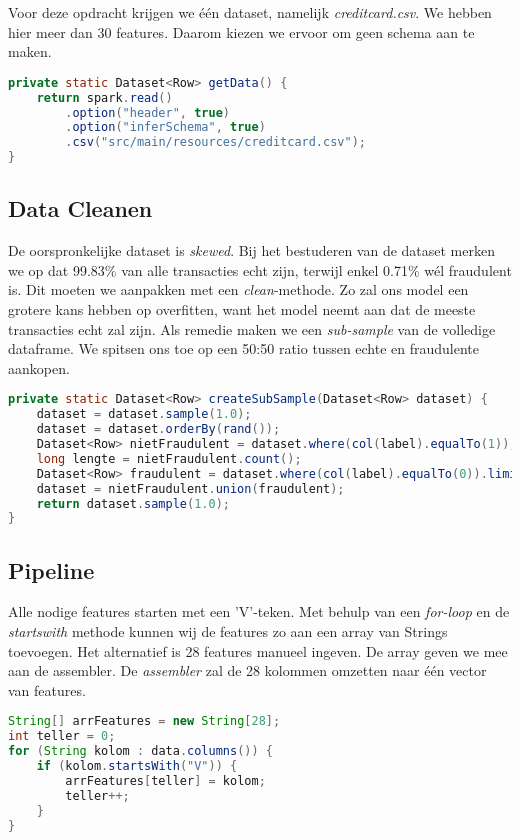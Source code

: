\documentclass[a4paper,10pt,twoside]{report}
\begin{document}
Voor deze opdracht krijgen we één dataset, namelijk \textit{creditcard.csv}. We hebben hier meer dan 30 features. Daarom kiezen we ervoor om geen schema aan te maken.

\begin{lstlisting}[language=Java]
private static Dataset<Row> getData() {
	return spark.read()
		.option("header", true)
		.option("inferSchema", true)
		.csv("src/main/resources/creditcard.csv");
}
\end{lstlisting}

\subsection*{Data Cleanen}

De oorspronkelijke dataset is \textit{skewed}. Bij het bestuderen van de dataset merken we op dat 99.83\% van alle transacties echt zijn, terwijl enkel 0.71\% wél fraudulent is. Dit moeten we aanpakken met een \textit{clean}-methode. Zo zal ons model een grotere kans hebben op overfitten, want het model neemt aan dat de meeste transacties echt zal zijn. Als remedie maken we een \textit{sub-sample} van de volledige dataframe. We spitsen ons toe op een 50:50 ratio tussen echte en fraudulente aankopen.

\begin{lstlisting}[language=Java]
private static Dataset<Row> createSubSample(Dataset<Row> dataset) {
	dataset = dataset.sample(1.0);
	dataset = dataset.orderBy(rand());
	Dataset<Row> nietFraudulent = dataset.where(col(label).equalTo(1));
	long lengte = nietFraudulent.count();
	Dataset<Row> fraudulent = dataset.where(col(label).equalTo(0)).limit((int) lengte);
	dataset = nietFraudulent.union(fraudulent);
	return dataset.sample(1.0);
}
\end{lstlisting}

\subsection*{Pipeline}

Alle nodige features starten met een 'V'-teken. Met behulp van een \textit{for-loop} en de \textit{startswith} methode kunnen wij de features zo aan een array van Strings toevoegen. Het alternatief is 28 features manueel ingeven. De array geven we mee aan de assembler. De \textit{assembler} zal de 28 kolommen omzetten naar één vector van features.

\begin{lstlisting}[language=Java]
String[] arrFeatures = new String[28];
int teller = 0;
for (String kolom : data.columns()) {
	if (kolom.startsWith("V")) {
		arrFeatures[teller] = kolom;
		teller++;
	}
}
\end{lstlisting}
\end{document}

